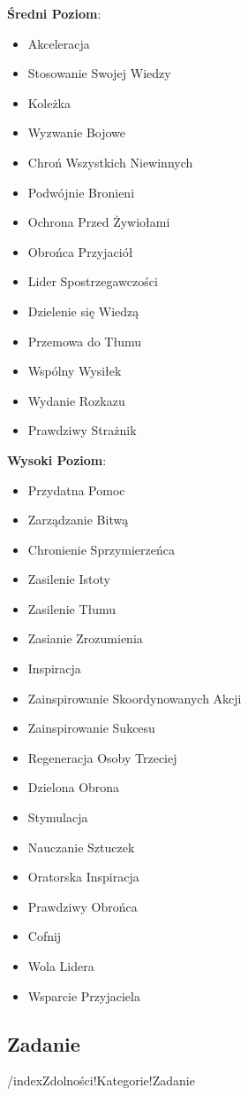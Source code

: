 \textbf{Średni Poziom}:

\begin{itemize}
\item Akceleracja
\item Stosowanie Swojej Wiedzy
\item Koleżka
\item Wyzwanie Bojowe
\item Chroń Wszystkich Niewinnych
\item Podwójnie Bronieni
\item Ochrona Przed Żywiołami
\item Obrońca Przyjaciół
\item Lider Spostrzegawczości
\item Dzielenie się Wiedzą
\item Przemowa do Tłumu
\item Wspólny Wysiłek
\item Wydanie Rozkazu
\item Prawdziwy Strażnik
\end{itemize}

\textbf{Wysoki Poziom}:

\begin{itemize}
\item Przydatna Pomoc
\item Zarządzanie Bitwą
\item Chronienie Sprzymierzeńca
\item Zasilenie Istoty
\item Zasilenie Tłumu
\item Zasianie Zrozumienia
\item Inspiracja
\item Zainspirowanie Skoordynowanych Akcji
\item Zainspirowanie Sukcesu
\item Regeneracja Osoby Trzeciej
\item Dzielona Obrona
\item Stymulacja
\item Nauczanie Sztuczek
\item Oratorska Inspiracja
\item Prawdziwy Obrońca
\item Cofnij
\item Wola Lidera
\item Wsparcie Przyjaciela
\end{itemize}

\subsection{Zadanie}/index{Zdolności!Kategorie!Zadanie}

